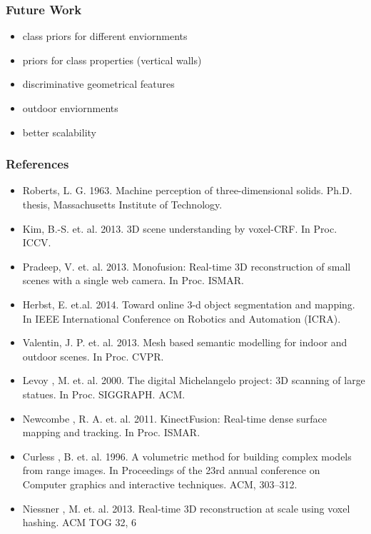 \documentclass[mathserif, 10pt]{beamer}
\begin{document}
\begin{frame}
\frametitle{Future Work}
\begin{itemize}
 \item class priors for different enviornments
 \item priors for class properties (vertical walls)
 \item discriminative geometrical features
 \item outdoor enviornments
 \item better scalability
\end{itemize}


\end{frame}


\begin{frame}
\frametitle{References}
\fontsize{6pt}{7.2}\selectfont
\begin{itemize}
  \item Roberts, L. G. 1963. Machine perception of three-dimensional solids. Ph.D. thesis, Massachusetts Institute of Technology.

  \item Kim, B.-S. et. al. 2013. 3D scene understanding by voxel-CRF. In Proc. ICCV.

  \item Pradeep, V. et. al. 2013. Monofusion: Real-time 3D reconstruction of small scenes with a single web camera. In Proc. ISMAR.

  \item Herbst, E. et.al. 2014. Toward online 3-d object segmentation and mapping. In IEEE International Conference on Robotics and Automation (ICRA).

  \item Valentin, J. P. et. al. 2013. Mesh based semantic modelling for indoor and outdoor scenes. In Proc. CVPR.

  \item Levoy , M. et. al. 2000. The digital Michelangelo project: 3D scanning of large statues. In Proc. SIGGRAPH. ACM.

  \item Newcombe , R. A. et. al. 2011. KinectFusion: Real-time dense surface mapping and tracking. In Proc. ISMAR.  
  
  \item Curless , B. et. al. 1996. A volumetric method for building complex models from range images. In Proceedings of the 23rd annual conference on Computer graphics and interactive techniques. ACM, 303–312.
  
  \item Niessner , M. et. al. 2013. Real-time 3D reconstruction at scale using voxel hashing. ACM TOG 32, 6
\end{itemize}
\end{frame}
\end{document}
